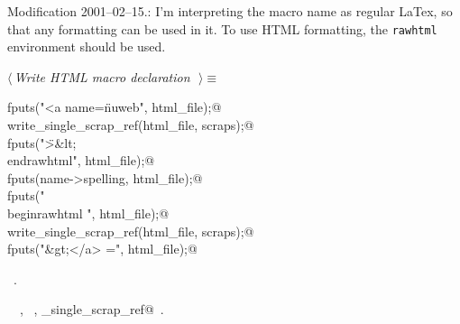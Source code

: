 \documentclass{report}
\begin{document}
Modification 2001--02--15.: I'm interpreting the macro name
as regular LaTex, so that any formatting can be used in it. To use
HTML formatting, the \verb|rawhtml| environment should be used.

\begin{flushleft} \small
\begin{minipage}{\linewidth} \label{scrap103}
$\langle\,${\it Write HTML macro declaration}\nobreak\ {\footnotesize {}}$\,\rangle\equiv$
\vspace{-1ex}
\begin{list}{}{} \item
\mbox{}\verb@  fputs("<a name=\"nuweb", html_file);@\\
\mbox{}\verb@  write_single_scrap_ref(html_file, scraps);@\\
\mbox{}\verb@  fputs("\">&lt;\\end{rawhtml}", html_file);@\\
\mbox{}\verb@  fputs(name->spelling, html_file);@\\
\mbox{}\verb@  fputs("\\begin{rawhtml} ", html_file);@\\
\mbox{}\verb@  write_single_scrap_ref(html_file, scraps);@\\
\mbox{}\verb@  fputs("&gt;</a> =\n", html_file);@\\
\mbox{}\verb@@{\NWsep}
\end{list}
\vspace{-1ex}
\footnotesize\addtolength{\baselineskip}{-1ex}
\begin{list}{}{\setlength{\itemsep}{-\parsep}\setlength{\itemindent}{-\leftmargin}}
\item \NWtxtMacroRefIn\ .
\end{list}
\vspace{-2ex}
\footnotesize\addtolength{\baselineskip}{-1ex}
\begin{list}{}{\setlength{\itemsep}{-\parsep}\setlength{\itemindent}{-\leftmargin}}
\item \NWtxtIdentsUsed\nobreak\  \verb@fputs@\nobreak\ , \verb@scraps@\nobreak\ , \verb@write_single_scrap_ref@\nobreak\ .\end{list}
\end{minipage}\\[4ex]
\end{flushleft}
\end{document}
